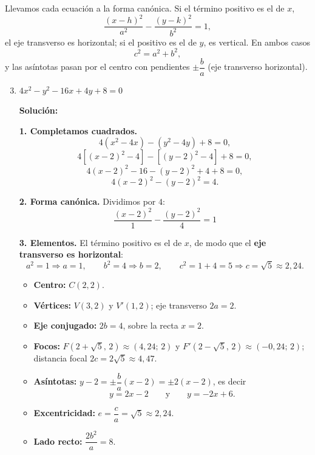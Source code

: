 \documentclass[12pt]{article}
\newcommand{\solucion}{%
    \vspace{0.8em}%
    \textbf{Solución:}%
    \vspace{0.8em}%
}
\begin{document}
\vspace{0.5em}
Llevamos cada ecuación a la forma canónica. Si el término positivo es el de
$x$,
\[
\frac{(x-h)^{2}}{a^{2}}-\frac{(y-k)^{2}}{b^{2}}=1 ,
\]
el eje transverso es horizontal; si el positivo es el de $y$, es vertical. En
ambos casos
\[
c^{2}=a^{2}+b^{2},
\]
y las asíntotas pasan por el centro con pendientes $\pm\dfrac{b}{a}$
(eje transverso horizontal).

\begin{enumerate}[label=\alph*.-]

    \setcounter{enumi}{2} %

    \item $4x^{2}-y^{2}-16x+4y+8=0$

    \solucion

    \textbf{1. Completamos cuadrados.}
    \[
    4\left(x^{2}-4x\right)-\left(y^{2}-4y\right)+8=0 ,
    \]
    \[
    4\left[(x-2)^{2}-4\right]-\left[(y-2)^{2}-4\right]+8=0 ,
    \]
    \[
    4(x-2)^{2}-16-(y-2)^{2}+4+8=0 ,
    \]
    \[
    4(x-2)^{2}-(y-2)^{2}=4 .
    \]

    \textbf{2. Forma canónica.} Dividimos por $4$:
    \[
    \boxed{
    \frac{(x-2)^{2}}{1}-\frac{(y-2)^{2}}{4}=1
    }
    \]

    \textbf{3. Elementos.} El término positivo es el de $x$, de modo que el
    \textbf{eje transverso es horizontal}:
    \[
    a^{2}=1\Rightarrow a=1,
    \qquad
    b^{2}=4\Rightarrow b=2,
    \qquad
    c^{2}=1+4=5\Rightarrow c=\sqrt5\approx 2{,}24 .
    \]

    \begin{itemize}[leftmargin=2em, itemsep=0.1em]
        \item \textbf{Centro:} $C(2,2)$.
        \item \textbf{Vértices:} $V(3,2)$ y $V'(1,2)$; eje transverso $2a=2$.
        \item \textbf{Eje conjugado:} $2b=4$, sobre la recta $x=2$.
        \item \textbf{Focos:} $F(2+\sqrt5,\,2)\approx(4{,}24;\,2)$ y
        $F'(2-\sqrt5,\,2)\approx(-0{,}24;\,2)$; distancia focal
        $2c=2\sqrt5\approx 4{,}47$.
        \item \textbf{Asíntotas:} $y-2=\pm\dfrac{b}{a}(x-2)=\pm2(x-2)$, es
        decir
        \[
        y=2x-2
        \qquad\text{y}\qquad
        y=-2x+6 .
        \]
        \item \textbf{Excentricidad:} $e=\dfrac{c}{a}=\sqrt5\approx 2{,}24$.
        \item \textbf{Lado recto:} $\dfrac{2b^{2}}{a}=8$.
    \end{itemize}


\end{enumerate}
\end{document}
